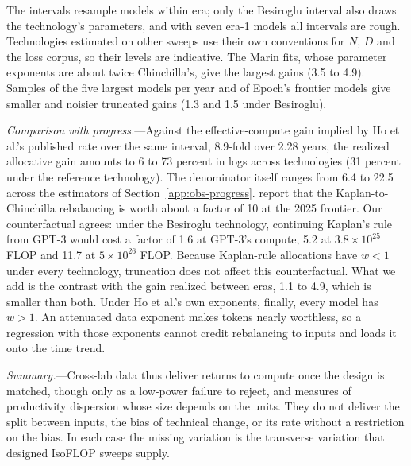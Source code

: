 The intervals resample models within era; only the Besiroglu interval also draws the technology's parameters, and with
seven era-1 models all intervals are rough. Technologies estimated on other sweeps use their own conventions for $N$,
$D$ and the loss corpus, so their levels are indicative. The Marin fits, whose parameter exponents are about twice
Chinchilla's, give the largest gains (3.5 to 4.9). Samples of the five largest models per year and of Epoch's frontier
models give smaller and noisier truncated gains (1.3 and 1.5 under Besiroglu).

\emph{Comparison with progress.}---Against the effective-compute gain implied by Ho et al.'s published rate over the
same interval, 8.9-fold over 2.28 years, the realized allocative gain amounts to 6 to 73 percent in logs across
technologies (31 percent under the reference technology). The denominator itself ranges from 6.4 to 22.5 across the
estimators of Section~\ref{app:obs-progress}. \citet{gundlach2025origin} report that the Kaplan-to-Chinchilla
rebalancing is worth about a factor of 10 at the 2025 frontier. Our counterfactual agrees: under the Besiroglu
technology, continuing Kaplan's rule from GPT-3 would cost a factor of 1.6 at GPT-3's compute, 5.2 at
$3.8\times10^{25}$ FLOP and 11.7 at $5\times10^{26}$ FLOP. Because Kaplan-rule allocations have $w<1$ under every
technology, truncation does not affect this counterfactual. What we add is the contrast with the gain realized between
eras, 1.1 to 4.9, which is smaller than both. Under Ho et al.'s own exponents, finally, every model has $w>1$. An
attenuated data exponent makes tokens nearly worthless, so a regression with those exponents cannot credit rebalancing
to inputs and loads it onto the time trend.

\emph{Summary.}---Cross-lab data thus deliver returns to compute once the design is matched, though only as a
low-power failure to reject, and measures of productivity dispersion whose size depends on the units. They do not
deliver the split between inputs, the bias of technical change, or its rate without a restriction on the bias. In each
case the missing variation is the transverse variation that designed IsoFLOP sweeps supply.
